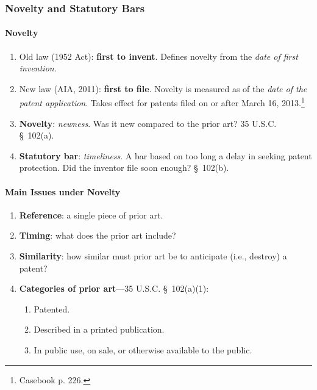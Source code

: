 \subsubsection{Novelty and Statutory Bars}

\paragraph{Novelty}

\begin{enumerate}
    \item Old law (1952 Act): \textbf{first to invent}. Defines novelty from 
    the \emph{date of first invention}.
    \item New law (AIA, 2011): \textbf{first to file}. Novelty is measured as 
    of the \emph{date of the patent application}. Takes effect for patents 
    filed on or after March 16, 2013.\footnote{Casebook p. 226.}
    \item \textbf{Novelty}: \emph{newness}. Was it new compared to the prior 
    art? 35 U.S.C. \S\ 102(a).
    \item \textbf{Statutory bar}: \emph{timeliness}. A bar based on too long a 
    delay in seeking patent protection. Did the inventor file soon enough? \S\ 
    102(b).
\end{enumerate}

\paragraph{Main Issues under Novelty}

\begin{enumerate}
    \item \textbf{Reference}: a single piece of prior art.
    \item \textbf{Timing}: what does the prior art include?
    \item \textbf{Similarity}: how similar must prior art be to anticipate 
    (i.e., destroy) a patent?
    \item \textbf{Categories of prior art}---35 U.S.C. \S\ 102(a)(1):
    \begin{enumerate}
        \item Patented.
        \item Described in a printed publication.
        \item In public use, on sale, or otherwise available to the public.
    \end{enumerate}
\end{enumerate}

